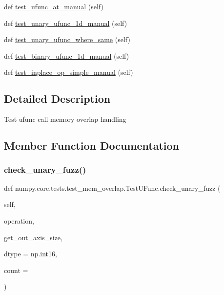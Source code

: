 \begin{DoxyCompactItemize}
\item 
def \hyperlink{classnumpy_1_1core_1_1tests_1_1test__mem__overlap_1_1TestUFunc_ab1f2bc94e1140e7bfe6548f1d31cbc89}{test\+\_\+ufunc\+\_\+at\+\_\+manual} (self)
\item 
def \hyperlink{classnumpy_1_1core_1_1tests_1_1test__mem__overlap_1_1TestUFunc_a80b350eb4e7261219fb6e69451c4f4c0}{test\+\_\+unary\+\_\+ufunc\+\_\+1d\+\_\+manual} (self)
\item 
def \hyperlink{classnumpy_1_1core_1_1tests_1_1test__mem__overlap_1_1TestUFunc_a0d4b1b05d7581e2bc8adcb83f612c653}{test\+\_\+unary\+\_\+ufunc\+\_\+where\+\_\+same} (self)
\item 
def \hyperlink{classnumpy_1_1core_1_1tests_1_1test__mem__overlap_1_1TestUFunc_ab0a2006799d369a3cd4d4e247caec85c}{test\+\_\+binary\+\_\+ufunc\+\_\+1d\+\_\+manual} (self)
\item 
def \hyperlink{classnumpy_1_1core_1_1tests_1_1test__mem__overlap_1_1TestUFunc_a5a6b6b2e835686bd7c8b7d4d1cbfba34}{test\+\_\+inplace\+\_\+op\+\_\+simple\+\_\+manual} (self)
\end{DoxyCompactItemize}


\subsection{Detailed Description}
\begin{DoxyVerb}Test ufunc call memory overlap handling
\end{DoxyVerb}
 

\subsection{Member Function Documentation}
\mbox{\label{classnumpy_1_1core_1_1tests_1_1test__mem__overlap_1_1TestUFunc_adfd9961c77a338fc60c68c382f74d4eb}} 
\subsubsection{\texorpdfstring{check\+\_\+unary\+\_\+fuzz()}{check\_unary\_fuzz()}}
{\footnotesize\ttfamily def numpy.\+core.\+tests.\+test\+\_\+mem\+\_\+overlap.\+Test\+U\+Func.\+check\+\_\+unary\+\_\+fuzz (\begin{DoxyParamCaption}\item[{}]{self,  }\item[{}]{operation,  }\item[{}]{get\+\_\+out\+\_\+axis\+\_\+size,  }\item[{}]{dtype = {\ttfamily np.int16},  }\item[{}]{count = {} }\end{DoxyParamCaption})}

